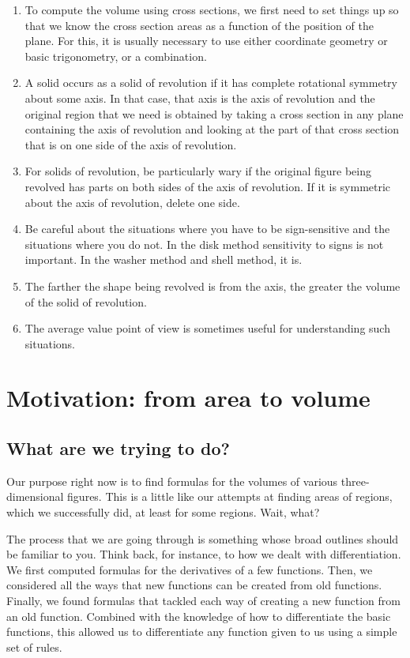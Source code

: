 \documentclass[10pt]{amsart}
\begin{document}
\begin{enumerate}
\item To compute the volume using cross sections, we first need to set
  things up so that we know the cross section areas as a function of
  the position of the plane. For this, it is usually necessary to use
  either coordinate geometry or basic trigonometry, or a combination.
\item A solid occurs as a solid of revolution if it has complete
  rotational symmetry about some axis. In that case, that axis is the
  axis of revolution and the original region that we need is obtained
  by taking a cross section in any plane containing the axis of
  revolution and looking at the part of that cross section that is on
  one side of the axis of revolution.
\item For solids of revolution, be particularly wary if the original
  figure being revolved has parts on both sides of the axis of
  revolution. If it is symmetric about the axis of revolution, delete
  one side.
\item Be careful about the situations where you have to be
  sign-sensitive and the situations where you do not. In the disk
  method sensitivity to signs is not important. In the washer method
  and shell method, it is.
\item The farther the shape being revolved is from the axis, the
  greater the volume of the solid of revolution.
\item The average value point of view is sometimes useful for
  understanding such situations.
\end{enumerate}

\section{Motivation: from area to volume}

\subsection{What are we trying to do?}

Our purpose right now is to find formulas for the volumes of various
three-dimensional figures. This is a little like our attempts at
finding areas of regions, which we successfully did, at least for some
regions. Wait, what?

The process that we are going through is something whose broad
outlines should be familiar to you. Think back, for instance, to how
we dealt with differentiation. We first computed formulas for the
derivatives of a few functions. Then, we considered all the ways that
new functions can be created from old functions. Finally, we found
formulas that tackled each way of creating a new function from an old
function. Combined with the knowledge of how to differentiate the
basic functions, this allowed us to differentiate any function given
to us using a simple set of rules.
\end{document}
